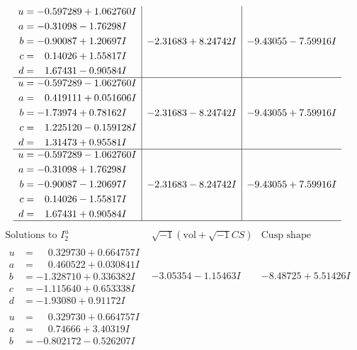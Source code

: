 \documentclass[1p]{elsarticle_modified}
\theoremstyle{definition}
\newcommand{\I}{\sqrt{-1}}
\begin{document}
$$\begin{array}{c|c|c}
\begin{aligned}
u &= -0.597289 + 1.062760 I \\
a &= -0.31098 - 1.76298 I \\
b &= -0.90087 + 1.20697 I \\
c &= \phantom{-}0.14026 + 1.55817 I \\
d &= \phantom{-}1.67431 - 0.90584 I\end{aligned}
 & -2.31683 + 8.24742 I & -9.43055 - 7.59916 I \\ \hline\begin{aligned}
u &= -0.597289 - 1.062760 I \\
a &= \phantom{-}0.419111 + 0.051606 I \\
b &= -1.73974 + 0.78162 I \\
c &= \phantom{-}1.225120 - 0.159128 I \\
d &= \phantom{-}1.31473 + 0.95581 I\end{aligned}
 & -2.31683 - 8.24742 I & -9.43055 + 7.59916 I \\ \hline\begin{aligned}
u &= -0.597289 - 1.062760 I \\
a &= -0.31098 + 1.76298 I \\
b &= -0.90087 - 1.20697 I \\
c &= \phantom{-}0.14026 - 1.55817 I \\
d &= \phantom{-}1.67431 + 0.90584 I\end{aligned}
 & -2.31683 - 8.24742 I & -9.43055 + 7.59916 I\\
 \hline 
 \end{array}$$\newpage$$\begin{array}{c|c|c}  
\text{Solutions to }I^u_{2}& \I (\text{vol} + \sqrt{-1}CS) & \text{Cusp shape}\\
 \hline 
\begin{aligned}
u &= \phantom{-}0.329730 + 0.664757 I \\
a &= \phantom{-}0.460522 + 0.030841 I \\
b &= -1.328710 + 0.336382 I \\
c &= -1.115640 + 0.653338 I \\
d &= -1.93080 + 0.91172 I\end{aligned}
 & -3.05354 - 1.15463 I & -8.48725 + 5.51426 I \\ \hline\begin{aligned}
u &= \phantom{-}0.329730 + 0.664757 I \\
a &= \phantom{-}0.74666 + 3.40319 I \\
b &= -0.802172 - 0.526207 I \\

\end{aligned}
\end{array}$$
\end{document}
